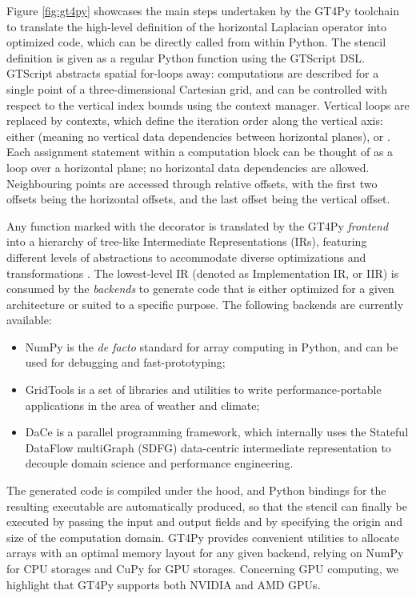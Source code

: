 \documentclass[gmd,manuscript,online]{copernicus}
\theoremstyle{theorem}
\theoremstyle{definition}
\theoremstyle{remark}
\theoremstyle{proposition}
\begin{document}
	Figure \ref{fig:gt4py} showcases the main steps undertaken by the GT4Py toolchain to translate the high-level definition of the horizontal Laplacian operator into optimized code, which can be directly called from within Python. The stencil definition is given as a regular Python function using the GTScript DSL. GTScript abstracts spatial for-loops away: computations are described for a single point of a three-dimensional Cartesian grid, and can be controlled with respect to the vertical index bounds using the  context manager. Vertical loops are replaced by  contexts, which define the iteration order along the vertical axis: either  (meaning no vertical data dependencies between horizontal planes),  or . Each assignment statement within a computation block can be thought of as a loop over a horizontal plane; no horizontal data dependencies are allowed. Neighbouring points are accessed through relative offsets, with the first two offsets being the horizontal offsets, and the last offset being the vertical offset.

	Any function marked with the  decorator is translated by the GT4Py \emph{frontend} into a hierarchy of tree-like Intermediate Representations (IRs), featuring different levels of abstractions to accommodate diverse optimizations and transformations \citep{gysi21}. The lowest-level IR (denoted as Implementation IR, or IIR) is consumed by the \emph{backends} to generate code that is either optimized for a given architecture or suited to a specific purpose. The following backends are currently available:
	\begin{itemize}
		\item NumPy \citep{harris20} is the \emph{de facto} standard for array computing in Python, and can be used for debugging and fast-prototyping;
		\item GridTools \citep{afanasyev21} is a set of libraries and utilities to write performance-portable applications in the area of weather and climate;
		\item DaCe \citep{ben-nun19} is a parallel programming framework, which internally uses the Stateful DataFlow multiGraph (SDFG) data-centric intermediate representation to decouple domain science and performance engineering.
	\end{itemize}
	The generated code is compiled under the hood, and Python bindings for the resulting executable are automatically produced, so that the stencil can finally be executed by passing the input and output fields and by specifying the origin and size of the computation domain. GT4Py provides convenient utilities to allocate arrays with an optimal memory layout for any given backend, relying on NumPy for CPU storages and CuPy \citep{nishino17} for GPU storages. Concerning GPU computing, we highlight that GT4Py supports both NVIDIA and AMD GPUs.
\end{document}
